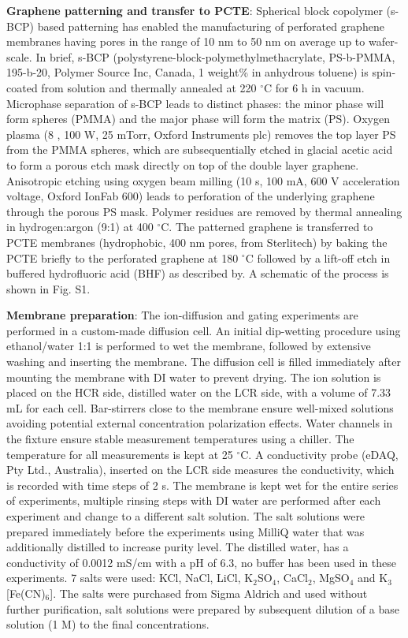 \documentclass[journal=langd5,email=true, hyperref=true, keywords=false]{achemso}
\newcommand{\Fig}{Fig.}
\begin{document}
\vspace{1em}
\noindent
\textbf{Graphene patterning and transfer to PCTE}: Spherical block
copolymer (s-BCP) based patterning has enabled the manufacturing of
perforated graphene membranes having pores in the range of 10 nm to 50
nm on average up to wafer-scale\cite{Choi_2018}. In brief, s-BCP
(polystyrene-block-polymethylmethacrylate, PS-b-PMMA, 195-b-20,
Polymer Source Inc, Canada, 1 weight\% in anhydrous toluene) is
spin-coated from solution and thermally annealed at 220 $^{\circ}$C
for 6 h in vacuum. Microphase separation of s-BCP leads to distinct
phases: the minor phase will form spheres (PMMA) and the major phase
will form the matrix (PS). Oxygen plasma (8 , 100 W, 25 mTorr, Oxford
Instruments plc) removes the top layer PS from the PMMA spheres, which
are subsequentially etched in glacial acetic acid to form a porous
etch mask directly on top of the double layer graphene. Anisotropic
etching using oxygen beam milling (10 s, 100 mA, 600 V acceleration
voltage, Oxford IonFab 600) leads to perforation of the underlying
graphene through the porous PS mask. Polymer residues are removed by
thermal annealing in hydrogen:argon (9:1) at 400 $^{\circ}$C. The
patterned graphene is transferred to PCTE membranes (hydrophobic, 400
nm pores, from Sterlitech) by baking the PCTE briefly to the
perforated graphene at 180 $^{\circ}$C followed by a lift-off etch in
buffered hydrofluoric acid (BHF) as described by\cite{Choi_2018}. A
schematic of the process is shown in \Fig{} S1.

\vspace{1em}
\noindent
\textbf{Membrane preparation}: The ion-diffusion and gating experiments are
performed in a custom-made diffusion cell. An initial dip-wetting
procedure using ethanol/water 1:1 is performed to wet the membrane,
followed by extensive washing and inserting the membrane. The
diffusion cell is filled immediately after mounting the membrane with
DI water to prevent drying. The ion solution is placed on the HCR
side, distilled water on the LCR side, with a volume of 7.33 mL for
each cell. Bar-stirrers close to the membrane ensure well-mixed
solutions avoiding potential external concentration polarization
effects. Water channels in the fixture ensure stable measurement
temperatures using a chiller. The temperature for all measurements is
kept at 25 $^{\circ}$C. A conductivity probe (eDAQ, Pty Ltd.,
Australia), inserted on the LCR side measures the conductivity, which
is recorded with time steps of 2 s. The membrane is kept wet for the
entire series of experiments, multiple rinsing steps with DI water are
performed after each experiment and change to a different salt
solution. The salt solutions were prepared immediately before the
experiments using MilliQ water that was additionally distilled to
increase purity level. The distilled water, has a conductivity of
0.0012 mS/cm with a pH of 6.3, no buffer has been used in these
experiments. 7 salts were used: KCl, NaCl, LiCl, K$_{2}$SO$_{4}$,
CaCl$_{2}$, MgSO$_{4}$ and K$_{3}$[Fe(CN)$_{6}$]. The salts were
purchased from Sigma Aldrich and used without further purification,
salt solutions were prepared by subsequent dilution of a base solution
(1 M) to the final concentrations.
\end{document}
